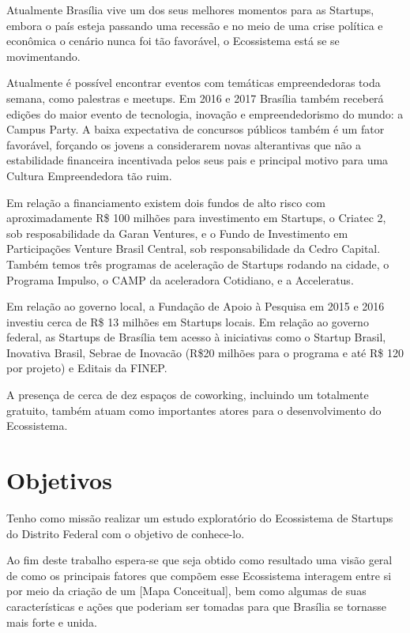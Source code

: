 Atualmente Brasília vive um dos seus melhores momentos para as Startups, embora o país esteja passando uma recessão e no meio de uma crise política e econômica o cenário nunca foi tão favorável, o Ecossistema está se se movimentando. 

Atualmente é possível encontrar eventos com temáticas empreendedoras toda semana, como palestras e meetups. Em 2016 e 2017 Brasília também receberá edições do maior evento de tecnologia, inovação e empreendedorismo do mundo: a Campus Party. A baixa expectativa de concursos públicos também é um fator favorável, forçando os jovens a considerarem novas alterantivas que não a estabilidade financeira incentivada pelos seus pais e principal motivo para uma Cultura Empreendedora tão ruim.

Em relação a financiamento existem dois fundos de alto risco com aproximadamente R\$ 100 milhões para investimento em Startups, o Criatec 2, sob resposabilidade da Garan Ventures, e o Fundo de Investimento em Participações Venture Brasil Central, sob responsabilidade da Cedro Capital. Também temos três programas de aceleração de Startups rodando na cidade, o Programa Impulso, o CAMP da aceleradora Cotidiano, e a Acceleratus. 

Em relação ao governo local, a Fundação de Apoio à Pesquisa em 2015 e 2016 investiu cerca de R\$ 13 milhões em Startups locais. Em relação ao governo federal, as Startups de Brasília tem acesso à iniciativas como o Startup Brasil, Inovativa Brasil, Sebrae de Inovacão (R\$20 milhões para o programa e até R\$ 120 por projeto) e Editais da FINEP.

A presença de cerca de dez espaços de coworking, incluindo um totalmente gratuito, também atuam como importantes atores para o desenvolvimento do Ecossistema.

\section{Objetivos}
\label{section:objetivos}

Tenho como missão realizar um estudo exploratório do Ecossistema de Startups do Distrito Federal com o objetivo de conhece-lo. 

Ao fim deste trabalho espera-se que seja obtido como resultado uma visão geral de como os principais fatores que compõem esse Ecossistema interagem entre si por meio da criação de um [Mapa Conceitual], bem como algumas de suas características e ações que poderiam ser tomadas para que Brasília se tornasse mais forte e unida.

